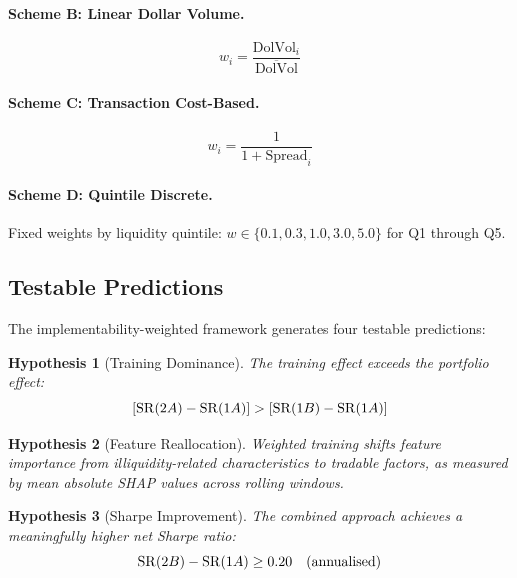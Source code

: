 \documentclass[a4paper,12pt,final]{article}
\newtheorem{hypothesis}{Hypothesis}
\begin{document}
\paragraph{Scheme B: Linear Dollar Volume.}
\begin{equation}
w_i = \frac{\text{DolVol}_i}{\overline{\text{DolVol}}}
\label{eq:linear_dolvol}
\end{equation}

\paragraph{Scheme C: Transaction Cost-Based.}
\begin{equation}
w_i = \frac{1}{1 + \text{Spread}_i}
\label{eq:tc_based}
\end{equation}

\paragraph{Scheme D: Quintile Discrete.}
Fixed weights by liquidity quintile: $w \in \{0.1, 0.3, 1.0, 3.0, 5.0\}$ for Q1 through Q5.

\subsection{Testable Predictions}
\label{subsec:predictions}

The implementability-weighted framework generates four testable predictions:

\begin{hypothesis}[Training Dominance]
\label{hyp:h1}
The training effect exceeds the portfolio effect:
\begin{equation}
\left[\mathrm{SR}(2A) - \mathrm{SR}(1A)\right] > \left[\mathrm{SR}(1B) - \mathrm{SR}(1A)\right]
\label{eq:h1}
\end{equation}
\end{hypothesis}

\begin{hypothesis}[Feature Reallocation]
\label{hyp:h2}
Weighted training shifts feature importance from illiquidity-related characteristics to tradable factors, as measured by mean absolute SHAP values across rolling windows.
\end{hypothesis}

\begin{hypothesis}[Sharpe Improvement]
\label{hyp:h3}
The combined approach achieves a meaningfully higher net Sharpe ratio:
\begin{equation}
\mathrm{SR}(2B) - \mathrm{SR}(1A) \geq 0.20 \quad \text{(annualised)}
\label{eq:h3}
\end{equation}
\end{hypothesis}
\end{document}
